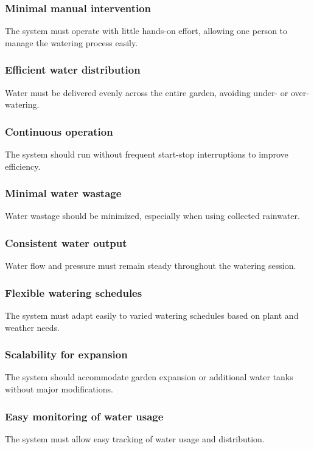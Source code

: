 \documentclass[12pt]{report}
\begin{document}
\subsubsection{Minimal manual intervention}
The system must operate with little hands-on effort, allowing one person to manage the watering process easily.

\subsubsection{Efficient water distribution}
Water must be delivered evenly across the entire garden, avoiding under- or over-watering.

\subsubsection{Continuous operation}
The system should run without frequent start-stop interruptions to improve efficiency.

\subsubsection{Minimal water wastage}
Water wastage should be minimized, especially when using collected rainwater.

\subsubsection{Consistent water output}
Water flow and pressure must remain steady throughout the watering session.

\subsubsection{Flexible watering schedules}
The system must adapt easily to varied watering schedules based on plant and weather needs.

\subsubsection{Scalability for expansion}
The system should accommodate garden expansion or additional water tanks without major modifications.

\subsubsection{Easy monitoring of water usage}
The system must allow easy tracking of water usage and distribution.
\end{document}
